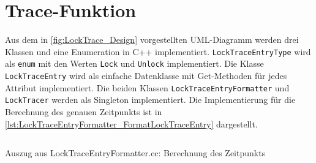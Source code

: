 \section{Trace-Funktion}
\label{section:Implementierung:Trace-Funktion}
Aus dem in \cref{fig:LockTrace_Design} vorgestellten UML-Diagramm werden drei
Klassen und eine Enumeration in C++ implementiert.
\texttt{Lock\-Trace\-Entry\-Type} wird als \texttt{enum} mit den Werten
\texttt{Lock} und \texttt{Unlock} implementiert. Die Klasse
\texttt{Lock\-Trace\-Entry} wird als einfache Datenklasse mit Get-Methoden für
jedes Attribut implementiert. Die beiden Klassen
\texttt{Lock\-Trace\-Entry\-Formatter} und \texttt{Lock\-Tracer} werden als
Singleton implementiert. Die Implementierung für die Berechnung des genauen
Zeitpunkts ist in \cref{lst:LockTraceEntryFormatter_FormatLockTraceEntry}
dargestellt.
\begin{listing}[ht]
  \inputminted[frame=lines,linenos,firstline=31,lastline=33]{cpp}{./cpp/LockTraceEntryFormatter.cc}
  \caption{Auszug aus LockTraceEntryFormatter.cc: Berechnung des Zeitpunkts}
  \label{lst:LockTraceEntryFormatter_FormatLockTraceEntry}   
\end{listing}

